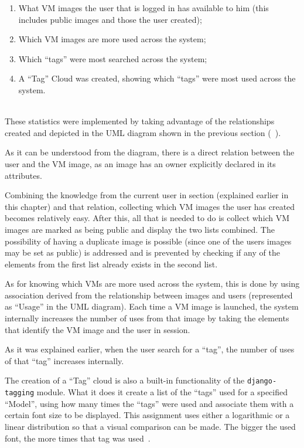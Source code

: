 \begin{enumerate}
\item What VM images the user that is logged in has available to him (this includes public images and those the user created);
\item Which VM images are more used across the system;
\item Which ``tags'' were most searched across the system;
\item A ``Tag'' Cloud was created, showing which ``tags'' were most used across the system.
\end{enumerate}
\ \\
These statistics were implemented by taking advantage of the relationships created and depicted in the UML diagram shown in the previous section (~). 

As it can be understood from the diagram, there is a direct relation between the user and the VM image, as an image has an owner explicitly declared in its attributes.

Combining the knowledge from the current user in section (explained earlier in this chapter) and that relation, collecting which VM images the user has created becomes relatively easy. After this, all that is needed to do is collect which VM images are marked as being public and display the two lists combined. The possibility of having a duplicate image is possible (since one of the users images may be set as public) is addressed and is prevented by checking if any of the elements from the first list already exists in the second list.

As for knowing which VMs are more used across the system, this is done by using association derived from the relationship between images and users (represented as ``Usage'' in the UML diagram). Each time a VM image is launched, the system internally increases the number of uses from that image by taking the elements that identify the VM image and the user in session. 

As it was explained earlier, when the user search for a ``tag'', the number of uses of that ``tag'' increases internally.

The creation of a ``Tag'' cloud is also a built-in functionality of the \texttt{django-tagging} module. What it does it create a list of the ``tags'' used for a specified ``Model'', using how many times the ``tags'' were used and associate them with a certain font size to be displayed. This assignment uses either a logarithmic or a linear distribution so that a visual comparison can be made. The bigger the used font, the more times that tag was used~\cite{django-tagging}.

